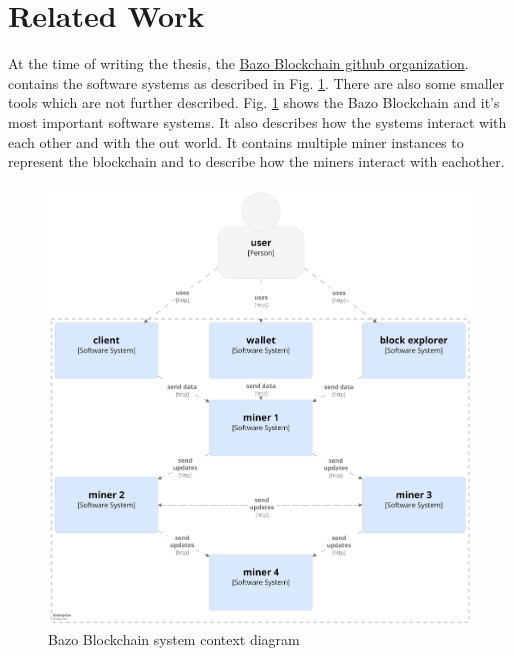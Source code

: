 \section{Related Work}
At the time of writing the thesis, the \href{https://github.com/bazo-blockchain}{Bazo Blockchain github organization}. contains the software systems as described in Fig. \ref{systemcontextdiagram}. There are also some smaller tools which are not further described. Fig. \ref{systemcontextdiagram} shows the Bazo Blockchain and it's most important software systems.  It also describes how the systems interact with each other and with the out world. It contains multiple miner instances to represent the blockchain and to describe how the miners interact with eachother.

\begin{figure}[H]
	\begin{center}
	\includegraphics[width=\textwidth]{./images/BAZO_System_Context}
	\caption{Bazo Blockchain system context diagram}
	\label{systemcontextdiagram}
	\end{center}
\end{figure}
\pagebreak

